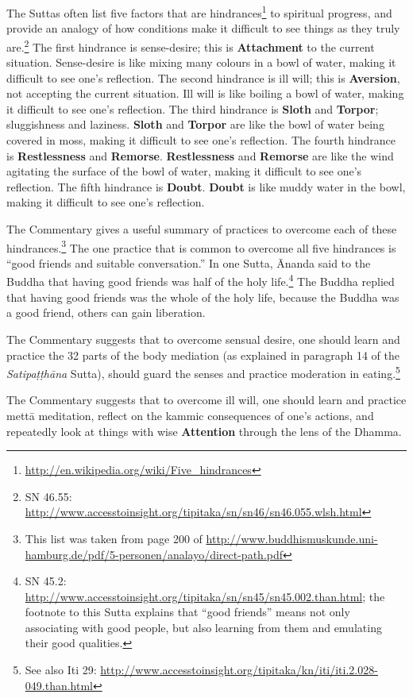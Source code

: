The Suttas often list five factors that are hindrances\footnote{\url{http://en.wikipedia.org/wiki/Five_hindrances}} to spiritual progress, and provide an analogy of how conditions make it difficult to see things as they truly are.\footnote{SN 46.55: \url{http://www.accesstoinsight.org/tipitaka/sn/sn46/sn46.055.wlsh.html}} The first hindrance is sense-desire; this is \textbf{Attachment} to the current situation. Sense-desire is like mixing many colours in a bowl of water, making it difficult to see one’s reflection. The second hindrance is ill will; this is \textbf{Aversion}, not accepting the current situation. Ill will is like boiling a bowl of water, making it difficult to see one’s reflection. The third hindrance is \textbf{Sloth} and \textbf{Torpor}; sluggishness and laziness. \textbf{Sloth} and \textbf{Torpor} are like the bowl of water being covered in moss, making it difficult to see one’s reflection. The fourth hindrance is \textbf{Restlessness} and \textbf{Remorse}. \textbf{Restlessness} and \textbf{Remorse} are like the wind agitating the surface of the bowl of water, making it difficult to see one’s reflection. The fifth hindrance is \textbf{Doubt}. \textbf{Doubt} is like muddy water in the bowl, making it difficult to see one’s reflection.

The Commentary gives a useful summary of practices to overcome each of these hindrances.\footnote{This list was taken from page 200 of \url{http://www.buddhismuskunde.uni-hamburg.de/pdf/5-personen/analayo/direct-path.pdf}} The one practice that is common to overcome all five hindrances is “good friends and suitable conversation.” In one Sutta, Ānanda said to the Buddha that having good friends was half of the holy life.\footnote{SN 45.2: \url{http://www.accesstoinsight.org/tipitaka/sn/sn45/sn45.002.than.html}; the footnote to this Sutta explains that “good friends” means not only associating with good people, but also learning from them and emulating their good qualities.} The Buddha replied that having good friends was the whole of the holy life, because the Buddha was a good friend, others can gain liberation.

The Commentary suggests that to overcome sensual desire, one should learn and practice the 32 parts of the body mediation (as explained in paragraph 14 of the \textit{Satipaṭṭhāna} Sutta), should guard the senses and practice moderation in eating.\footnote{See also Iti 29: \url{http://www.accesstoinsight.org/tipitaka/kn/iti/iti.2.028-049.than.html}}

The Commentary suggests that to overcome ill will, one should learn and practice mettā meditation, reflect on the kammic consequences of one’s actions, and repeatedly look at things with wise \textbf{Attention} through the lens of the Dhamma.

